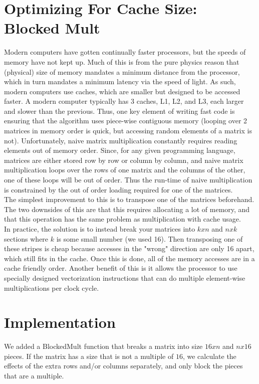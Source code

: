 \documentclass{article}         %
\begin{document}
\section*{Optimizing For Cache Size: Blocked Mult}
Modern computers have gotten continually faster processors, but the speeds of memory have not kept up. Much of this is from the pure physics reason that (physical) size of memory mandates a minimum distance from the processor, which in turn mandates a minimum latency via the speed of light. As such, modern computers use caches, which are smaller but designed to be accessed faster. A modern computer typically has 3 caches, L1, L2, and L3, each larger and slower than the previous. Thus, one key element of writing fast code is ensuring that the algorithm uses piece-wise contiguous memory (looping over 2 matrices in memory order is quick, but accessing random elements of a matrix is not). Unfortunately, naive matrix multiplication constantly requires reading elements out of memory order. Since, for any given programming language, matrices are either stored row by row or column by column, and naive matrix multiplication loops over the rows of one matrix and the columns of the other, one of these loops will be out of order. Thus the run-time of naive multiplication is constrained by the out of order loading required for one of the matrices.\\
The simplest improvement to this is to transpose one of the matrices beforehand. The two downsides of this are that this requires allocating a lot of memory, and that this operation has the same problem as multiplication with cache usage.\\
In practice, the solution is to instead break your matrices into $kxn$ and $nxk$ sections where $k$ is some small number (we used 16). Then transposing one of these stripes is cheap because accesses in the "wrong" direction are only 16 apart, which still fits in the cache. Once this is done, all of the memory accesses are in a cache friendly order. Another benefit of this is it allows the processor to use specially designed vectorization instructions that can do multiple element-wise multiplications per clock cycle. 

\section*{Implementation}
We added a BlockedMult function that breaks a matrix into size $16xn$ and $nx16$ pieces. If the matrix has a size that is not a multiple of $16$, we calculate the effects of the extra rows and/or columns separately, and only block the pieces that are a multiple.
\end{document}
